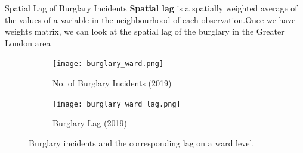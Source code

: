 \documentclass[10pt, aspectratio=169]{beamer}
\begin{document}

\begin{frame}{Spatial Lag of Burglary Incidents}
    \textbf{Spatial lag} is a spatially weighted average of the values of a 
    variable in the neighbourhood of each observation.Once we have weights matrix,
    we can look at the spatial lag of the burglary in the Greater London area
    
    \begin{figure}
        \centering
            \begin{subfigure}[t]{0.4\textwidth}
                \texttt{[image: burglary\_ward.png]}
                \caption{No. of Burglary Incidents (2019)}\label{fig:burglary}
            \end{subfigure} 
            \begin{subfigure}[t]{0.4\textwidth}
                \texttt{[image: burglary\_ward\_lag.png]}
                \caption{Burglary Lag (2019)}\label{fig:burglary_lag}
            \end{subfigure}
        \caption{Burglary incidents and the corresponding lag on a ward level.}\label{fig:lag}
    \end{figure}
\end{frame}
\end{document}
